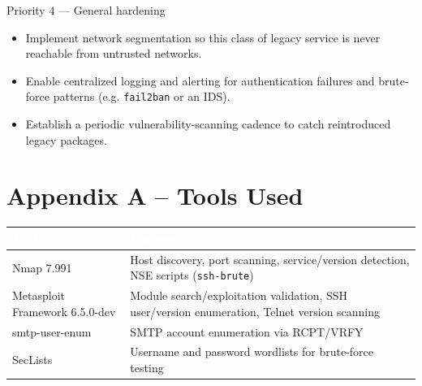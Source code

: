 \documentclass[11pt,a4paper]{article}
\begin{document}
\vspace{0.6em}
\begin{recbox}{Priority 4 --- General hardening}
\begin{itemize}[leftmargin=1.2em]
\item Implement network segmentation so this class of legacy service is never reachable from untrusted networks.
\item Enable centralized logging and alerting for authentication failures and brute-force patterns (e.g. \texttt{fail2ban} or an IDS).
\item Establish a periodic vulnerability-scanning cadence to catch reintroduced legacy packages.
\end{itemize}
\end{recbox}

\section*{Appendix A -- Tools Used}

\begin{table}[h!]
\centering
\renewcommand{\arraystretch}{1.3}
\begin{tabular}{p{3.6cm} p{9.5cm}}
\toprule
\rowcolor{navy}
\textcolor{white}{\textbf{Tool}} & \textcolor{white}{\textbf{Purpose}} \\
\midrule
Nmap 7.991 & Host discovery, port scanning, service/version detection, NSE scripts (\texttt{ssh-brute}) \\
Metasploit Framework 6.5.0-dev & Module search/exploitation validation, SSH user/version enumeration, Telnet version scanning \\
smtp-user-enum & SMTP account enumeration via RCPT/VRFY \\
SecLists & Username and password wordlists for brute-force testing \\
\bottomrule
\end{tabular}
\end{table}
\end{document}
